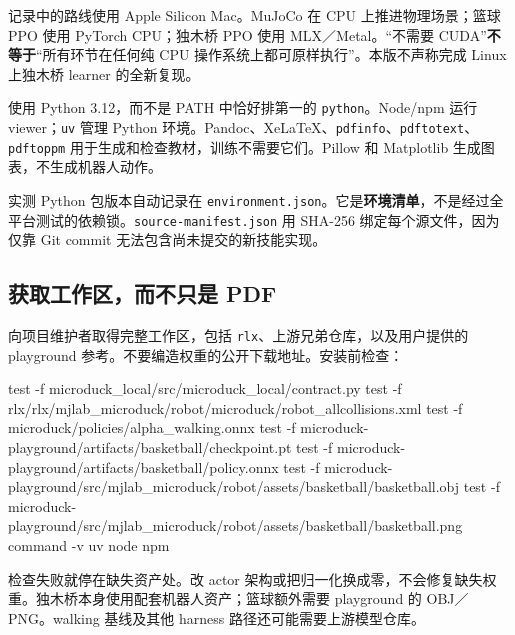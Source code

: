 \documentclass[
  chinese,
  11pt,
  letterpaper,
]{article}
\newenvironment{Shaded}{\begin{snugshade}}{\end{snugshade}}
\newcommand{\AttributeTok}[1]{\textcolor[rgb]{0.13,0.29,0.53}{#1}}
\newcommand{\BuiltInTok}[1]{#1}
\newcommand{\NormalTok}[1]{#1}
\renewenvironment{Shaded}{\par\smallskip}{\par\smallskip}
\begin{document}
记录中的路线使用 Apple Silicon Mac。MuJoCo 在 CPU 上推进物理场景；篮球
PPO 使用 PyTorch CPU；独木桥 PPO 使用 MLX／Metal。``不需要
CUDA''\textbf{不等于}``所有环节在任何纯 CPU
操作系统上都可原样执行''。本版不声称完成 Linux 上独木桥 learner
的全新复现。

使用 Python 3.12，而不是 PATH 中恰好排第一的 \texttt{python}。Node/npm
运行 viewer；\texttt{uv} 管理 Python
环境。Pandoc、XeLaTeX、\texttt{pdfinfo}、\texttt{pdftotext}、\texttt{pdftoppm}
用于生成和检查教材，训练不需要它们。Pillow 和 Matplotlib
生成图表，不生成机器人动作。

实测 Python 包版本自动记录在
\texttt{environm\allowbreak{}ent.json\allowbreak{}}。它是\textbf{环境清单}，不是经过全平台测试的依赖锁。\texttt{source-\allowbreak{}manifest\allowbreak{}.json}
用 SHA-256 绑定每个源文件，因为仅靠 Git commit
无法包含尚未提交的新技能实现。

\subsection{获取工作区，而不只是
PDF}\label{ux83b7ux53d6ux5de5ux4f5cux533aux800cux4e0dux53eaux662f-pdf}

向项目维护者取得完整工作区，包括
\texttt{rlx}、上游兄弟仓库，以及用户提供的 playground
参考。不要编造权重的公开下载地址。安装前检查：

\begin{Shaded}
\begin{Highlighting}[]
\BuiltInTok{test} \AttributeTok{{-}f}\NormalTok{ microduck\_local/src/microduck\_local/contract.py}
\BuiltInTok{test} \AttributeTok{{-}f}\NormalTok{ rlx/rlx/mjlab\_microduck/robot/microduck/robot\_allcollisions.xml}
\BuiltInTok{test} \AttributeTok{{-}f}\NormalTok{ microduck/policies/alpha\_walking.onnx}
\BuiltInTok{test} \AttributeTok{{-}f}\NormalTok{ microduck{-}playground/artifacts/basketball/checkpoint.pt}
\BuiltInTok{test} \AttributeTok{{-}f}\NormalTok{ microduck{-}playground/artifacts/basketball/policy.onnx}
\BuiltInTok{test} \AttributeTok{{-}f}\NormalTok{ microduck{-}playground/src/mjlab\_microduck/robot/assets/basketball/basketball.obj}
\BuiltInTok{test} \AttributeTok{{-}f}\NormalTok{ microduck{-}playground/src/mjlab\_microduck/robot/assets/basketball/basketball.png}
\BuiltInTok{command} \AttributeTok{{-}v}\NormalTok{ uv node npm}
\end{Highlighting}
\end{Shaded}

检查失败就停在缺失资产处。改 actor
架构或把归一化换成零，不会修复缺失权重。独木桥本身使用配套机器人资产；篮球额外需要
playground 的 OBJ／PNG。walking 基线及其他 harness
路径还可能需要上游模型仓库。
\end{document}
